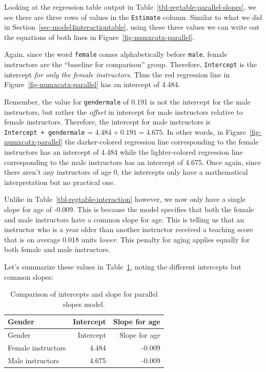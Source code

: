 \documentclass[
  letterpaper,
  DIV=11,
  numbers=noendperiod]{scrreprt}
\theoremstyle{definition}
\theoremstyle{remark}
\begin{document}
Looking at the regression table output in
Table~\ref{tbl-regtable-parallel-slopes}, we see there are three rows of
values in the \texttt{Estimate} column. Similar to what we did in
Section~\ref{sec-model4interactiontable}, using these three values we
can write out the equations of both lines in
Figure~\ref{fig-numxcatx-parallel}.

Again, since the word \texttt{female} comes alphabetically before
\texttt{male}, female instructors are the ``baseline for comparison''
group. Therefore, \texttt{Intercept} is the intercept \emph{for only the
female instructors}. Thus the red regression line in
Figure~\ref{fig-numxcatx-parallel} has an intercept of 4.484.

Remember, the value for \texttt{gendermale} of 0.191 is not the
intercept for the male instructors, but rather the \emph{offset} in
intercept for male instructors relative to female instructors.
Therefore, the intercept for male instructors is
\texttt{Intercept\ +\ gendermale} = \(4.484 + 0.191 = 4.675\). In other
words, in Figure~\ref{fig-numxcatx-parallel} the darker-colored
regression line corresponding to the female instructors has an intercept
of 4.484 while the lighter-colored regression line corresponding to the
male instructors has an intercept of 4.675. Once again, since there
aren't any instructors of age 0, the intercepts only have a mathematical
interpretation but no practical one.

Unlike in Table~\ref{tbl-regtable-interaction} however, we now only have
a single slope for age of -0.009. This is because the model specifies
that both the female and male instructors have a common slope for age.
 This is telling
us that an instructor who is a year older than another instructor
received a teaching score that is on average 0.018 units \emph{lower}.
This penalty for aging applies equally for both female and male
instructors.

Let's summarize these values in Table~\ref{tbl-parallel-slopes-summary},
noting the different intercepts but common slopes:

\hypertarget{tbl-parallel-slopes-summary}{}
\begin{longtable}[]{@{}lrr@{}}
\caption{\label{tbl-parallel-slopes-summary}Comparison of intercepts and
slope for parallel slopes model.}\tabularnewline
\toprule\noalign{}
Gender & Intercept & Slope for age \\
\midrule\noalign{}
\endfirsthead
\toprule\noalign{}
Gender & Intercept & Slope for age \\
\midrule\noalign{}
\endhead
\bottomrule\noalign{}
\endlastfoot
Female instructors & 4.484 & -0.009 \\
Male instructors & 4.675 & -0.009 \\
\end{longtable}
\end{document}
